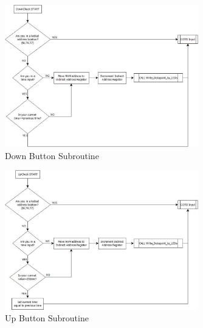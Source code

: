 \documentclass[10pt, twocolumn]{article}
\begin{document}
\begin{figure}
	\centering
	\includegraphics[width=0.75\textwidth]{user-interface-flowchart-2.pdf}
	\caption{Down Button Subroutine}
	\label{user-interface-flowchart-2}
\end{figure}

\begin{figure}
	\centering
	\includegraphics[width=0.75\textwidth]{user-interface-flowchart-3.pdf}
	\caption{Up Button Subroutine}
	\label{user-interface-flowchart-3}
\end{figure}
\end{document}
